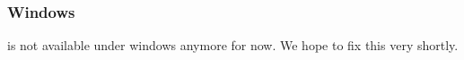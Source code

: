 
\subsubsection{Windows}

\uwebots{} is not available under windows anymore for now. We hope to
fix this very shortly.







